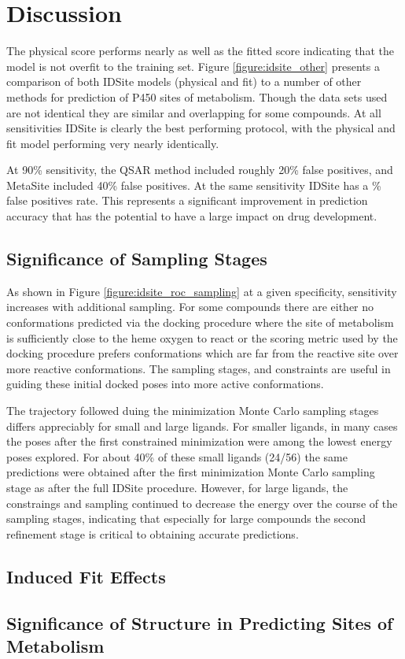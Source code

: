 \section{Discussion}
\label{section:p450/discussion}
The physical score performs nearly as well as the fitted score indicating that the model is not overfit to the training set.
Figure \ref{figure:idsite_other} presents a comparison of both IDSite models (physical and fit) to a number of other methods for prediction of P450 sites of metabolism.
Though the data sets used are not identical they are similar and overlapping for some compounds.
At all sensitivities IDSite is clearly the best performing protocol, with the physical and fit model performing very nearly identically.

At 90\% sensitivity, the QSAR method included roughly 20\% false positives, and MetaSite included 40\% false positives.
At the same sensitivity IDSite has a \% false positives rate.
This represents a significant improvement in prediction accuracy that has the potential to have a large impact on drug development.

\subsection{Significance of Sampling Stages}
\label{subsection:p450/discussion/sampling_stages}

As shown in Figure \ref{figure:idsite_roc_sampling} at a given specificity, sensitivity increases with additional sampling.
For some compounds there are either no conformations predicted via the docking procedure where the site of metabolism is sufficiently close to the heme oxygen to react or the scoring metric used by the docking procedure prefers conformations which are far from the reactive site over more reactive conformations.
The sampling stages, and constraints are useful in guiding these initial docked poses into more active conformations.

The trajectory followed duing the minimization Monte Carlo sampling stages differs appreciably for small and large ligands.
For smaller ligands, in many cases the poses after the first constrained minimization were among the lowest energy poses explored.
For about 40\% of these small ligands (24/56) the same predictions were obtained after the first minimization Monte Carlo sampling stage as after the full IDSite procedure.
However, for large ligands, the constraings and sampling continued to decrease the energy over the course of the sampling stages, indicating that especially for large compounds the second refinement stage is critical to obtaining accurate predictions.

\subsection{Induced Fit Effects}
\label{subsection:p450/discussion/induced_fit}



\subsection{Significance of Structure in Predicting Sites of Metabolism}
\label{subsection:p450/discussion/structure_effects}
